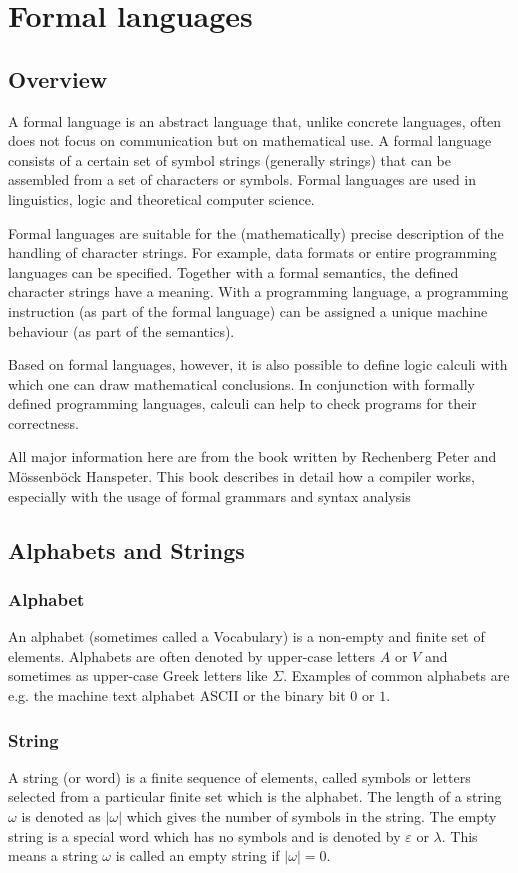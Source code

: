 \chapter{Formal languages}
\section{Overview}
A formal language is an abstract language that, unlike concrete languages, often does not focus on communication but on mathematical use. A formal language consists of a certain set of symbol strings (generally strings) that can be assembled from a set of characters or symbols. Formal languages are used in linguistics, logic and theoretical computer science.

Formal languages are suitable for the (mathematically) precise description of the handling of character strings. For example, data formats or entire programming languages can be specified. Together with a formal semantics, the defined character strings have a meaning. With a programming language, a programming instruction (as part of the formal language) can be assigned a unique machine behaviour (as part of the semantics).

Based on formal languages, however, it is also possible to define logic calculi with which one can draw mathematical conclusions. In conjunction with formally defined programming languages, calculi can help to check programs for their correctness.

All major information here are from the book \cite{rechenberg_compiler-generator_1988} written by Rechenberg Peter and Mössenböck Hanspeter. This book describes in detail how a compiler works, especially with the usage of formal grammars and syntax analysis 
\section{Alphabets and Strings}
\subsection{Alphabet}
An alphabet (sometimes called a Vocabulary) is a non-empty and finite set of elements. Alphabets are often denoted by upper-case letters $A$ or $V$ and sometimes as upper-case Greek letters like $\Sigma$. Examples of common alphabets are e.g. the machine text alphabet ASCII or the binary bit $0$ or $1$.
\subsection{String}
A string (or word) is a finite sequence of elements, called symbols or letters selected from a particular finite set which is the alphabet.
The length of a string $\omega$ is denoted as $|\omega|$ which gives the number of symbols in the string. The empty string is a special word which has no symbols and is denoted by $\varepsilon$ or $\lambda$. This means a string $\omega$ is called an empty string if $|\omega|=0$.
